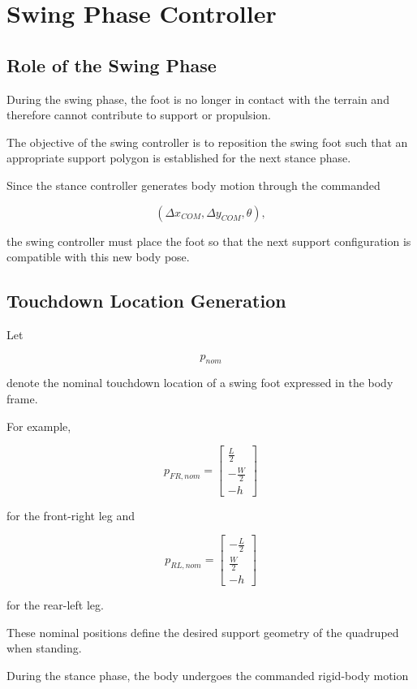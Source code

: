 \documentclass[11pt,a4paper]{report}
\begin{document}
\section{Swing Phase Controller}

\subsection{Role of the Swing Phase}

During the swing phase, the foot is no longer in contact with the
terrain and therefore cannot contribute to support or propulsion.

The objective of the swing controller is to reposition the swing foot
such that an appropriate support polygon is established for the next
stance phase.

Since the stance controller generates body motion through the commanded

\[
(\Delta x_{COM},\Delta y_{COM},\theta),
\]

the swing controller must place the foot so that the next support
configuration is compatible with this new body pose.

\subsection{Touchdown Location Generation}

Let

\[
p_{nom}
\]

denote the nominal touchdown location of a swing foot expressed in the
body frame.

For example,

\[
p_{FR,nom}
=
\begin{bmatrix}
\frac{L}{2}\\
-\frac{W}{2}\\
-h
\end{bmatrix}
\]

for the front-right leg and

\[
p_{RL,nom}
=
\begin{bmatrix}
-\frac{L}{2}\\
\frac{W}{2}\\
-h
\end{bmatrix}
\]

for the rear-left leg.

These nominal positions define the desired support geometry of the
quadruped when standing.

During the stance phase, the body undergoes the commanded rigid-body
motion
\end{document}
